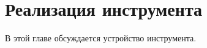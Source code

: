 \section{Реализация инструмента}
\label{sec:impl}

В этой главе обсуждается устройство инструмента.






